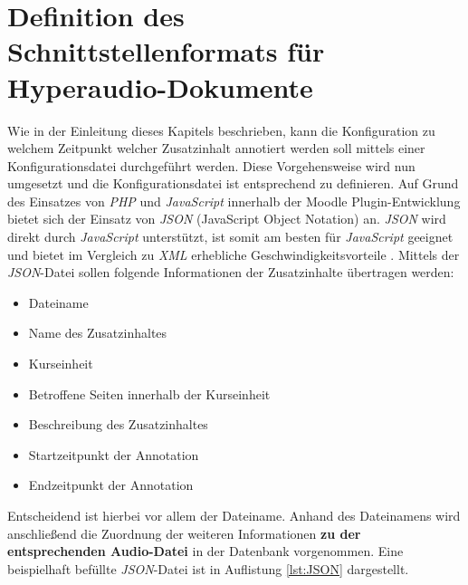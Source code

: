 \section{Definition des Schnittstellenformats für Hyperaudio-Dokumente}
\label{sec:konfigurationsdatei}
Wie in der Einleitung dieses Kapitels beschrieben, kann die Konfiguration zu welchem Zeitpunkt welcher Zusatzinhalt annotiert werden soll mittels einer Konfigurationsdatei durchgeführt werden. Diese Vorgehensweise wird nun umgesetzt und die Konfigurationsdatei ist entsprechend zu definieren.
Auf Grund des Einsatzes von \textit{PHP} und \textit{JavaScript} innerhalb der Moodle Plugin-Entwicklung bietet sich der Einsatz von \textit{JSON} (JavaScript Object Notation) an. \textit{JSON} wird direkt durch \textit{JavaScript} unterstützt, ist somit am besten für \textit{JavaScript} geeignet und bietet im Vergleich zu \textit{XML} erhebliche Geschwindigkeitsvorteile \citep{nurseitov2009comparison}.
Mittels der \textit{JSON}-Datei sollen folgende Informationen der Zusatzinhalte übertragen werden:

\begin{itemize}
\item Dateiname
\item Name des Zusatzinhaltes
\item Kurseinheit
\item Betroffene Seiten innerhalb der Kurseinheit
\item Beschreibung des Zusatzinhaltes
\item Startzeitpunkt der Annotation
\item Endzeitpunkt der Annotation
\end{itemize}

Entscheidend ist hierbei vor allem der Dateiname. Anhand des Dateinamens wird anschließend die Zuordnung der weiteren Informationen \textbf{zu der entsprechenden Audio-Datei} in der Datenbank vorgenommen. Eine beispielhaft befüllte \textit{JSON}-Datei ist in Auflistung \ref{lst:JSON} dargestellt.

